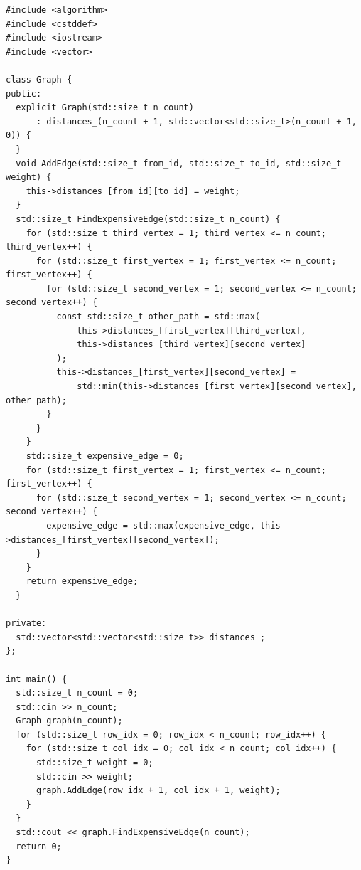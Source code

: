 \begin{lstlisting}
#include <algorithm>
#include <cstddef>
#include <iostream>
#include <vector>

class Graph {
public:
  explicit Graph(std::size_t n_count)
      : distances_(n_count + 1, std::vector<std::size_t>(n_count + 1, 0)) {
  }
  void AddEdge(std::size_t from_id, std::size_t to_id, std::size_t weight) {
    this->distances_[from_id][to_id] = weight;
  }
  std::size_t FindExpensiveEdge(std::size_t n_count) {
    for (std::size_t third_vertex = 1; third_vertex <= n_count; third_vertex++) {
      for (std::size_t first_vertex = 1; first_vertex <= n_count; first_vertex++) {
        for (std::size_t second_vertex = 1; second_vertex <= n_count; second_vertex++) {
          const std::size_t other_path = std::max(
              this->distances_[first_vertex][third_vertex],
              this->distances_[third_vertex][second_vertex]
          );
          this->distances_[first_vertex][second_vertex] =
              std::min(this->distances_[first_vertex][second_vertex], other_path);
        }
      }
    }
    std::size_t expensive_edge = 0;
    for (std::size_t first_vertex = 1; first_vertex <= n_count; first_vertex++) {
      for (std::size_t second_vertex = 1; second_vertex <= n_count; second_vertex++) {
        expensive_edge = std::max(expensive_edge, this->distances_[first_vertex][second_vertex]);
      }
    }
    return expensive_edge;
  }

private:
  std::vector<std::vector<std::size_t>> distances_;
};

int main() {
  std::size_t n_count = 0;
  std::cin >> n_count;
  Graph graph(n_count);
  for (std::size_t row_idx = 0; row_idx < n_count; row_idx++) {
    for (std::size_t col_idx = 0; col_idx < n_count; col_idx++) {
      std::size_t weight = 0;
      std::cin >> weight;
      graph.AddEdge(row_idx + 1, col_idx + 1, weight);
    }
  }
  std::cout << graph.FindExpensiveEdge(n_count);
  return 0;
}
\end{lstlisting}